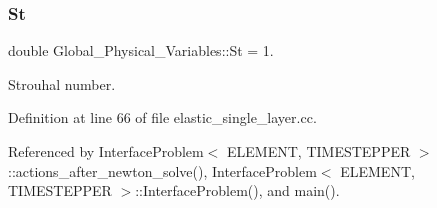 \mbox{\label{namespaceGlobal__Physical__Variables_a4b6ef72bd221361c37f5b9a4a6899afc}} 
\subsubsection{\texorpdfstring{St}{St}}
{\footnotesize\ttfamily double Global\+\_\+\+Physical\+\_\+\+Variables\+::\+St = 1.}



Strouhal number. 



Definition at line 66 of file elastic\+\_\+single\+\_\+layer.\+cc.



Referenced by Interface\+Problem$<$ E\+L\+E\+M\+E\+N\+T, T\+I\+M\+E\+S\+T\+E\+P\+P\+E\+R $>$\+::actions\+\_\+after\+\_\+newton\+\_\+solve(), Interface\+Problem$<$ E\+L\+E\+M\+E\+N\+T, T\+I\+M\+E\+S\+T\+E\+P\+P\+E\+R $>$\+::\+Interface\+Problem(), and main().

